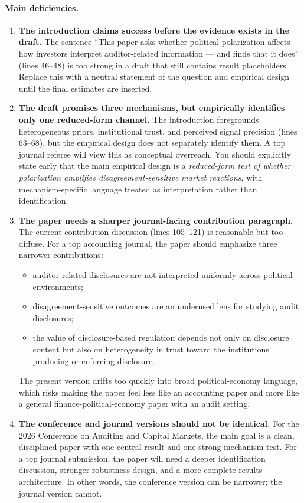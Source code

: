 \documentclass[12pt]{article}
\begin{document}
\paragraph{Main deficiencies.}

\begin{enumerate}
    \item \textbf{The introduction claims success before the evidence exists in the draft.} The sentence ``This paper asks whether political polarization affects how investors interpret auditor-related information --- and finds that it does'' (lines 46--48) is too strong in a draft that still contains result placeholders. Replace this with a neutral statement of the question and empirical design until the final estimates are inserted.

    \item \textbf{The draft promises three mechanisms, but empirically identifies only one reduced-form channel.} The introduction foregrounds heterogeneous priors, institutional trust, and perceived signal precision (lines 63--68), but the empirical design does not separately identify them. A top journal referee will view this as conceptual overreach. You should explicitly state early that the main empirical design is a \emph{reduced-form test of whether polarization amplifies disagreement-sensitive market reactions}, with mechanism-specific language treated as interpretation rather than identification.

    \item \textbf{The paper needs a sharper journal-facing contribution paragraph.} The current contribution discussion (lines 105--121) is reasonable but too diffuse. For a top accounting journal, the paper should emphasize three narrower contributions:
    \begin{itemize}
        \item auditor-related disclosures are not interpreted uniformly across political environments;
        \item disagreement-sensitive outcomes are an underused lens for studying audit disclosures;
        \item the value of disclosure-based regulation depends not only on disclosure content but also on heterogeneity in trust toward the institutions producing or enforcing disclosure.
    \end{itemize}
    The present version drifts too quickly into broad political-economy language, which risks making the paper feel less like an accounting paper and more like a general finance-political-economy paper with an audit setting.

    \item \textbf{The conference and journal versions should not be identical.} For the 2026 Conference on Auditing and Capital Markets, the main goal is a clean, disciplined paper with one central result and one strong mechanism test. For a top journal submission, the paper will need a deeper identification discussion, stronger robustness design, and a more complete results architecture. In other words, the conference version can be narrower; the journal version cannot.
\end{enumerate}
\end{document}
